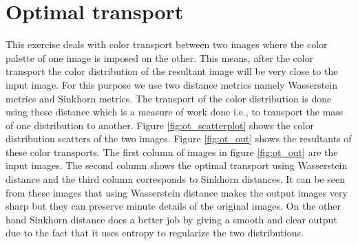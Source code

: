 \section{Optimal transport}
This exercise deals with color transport between two images where the color palette of one image is imposed on the other. This means, after the color transport the color distribution of the resultant image will be very close to the input image. For this purpose we use two distance metrics namely Wasserstein metrics and Sinkhorn  metrics. The transport of the color distribution is done using these distance which is a measure of work done i.e., to transport the mass of one distribution to another.  Figure \ref{fig:ot_scatterplot} shows the color distribution scatters of the two images. Figure \ref{fig:ot_out} shows the resultants of these color transports. The first column of images in figure \ref{fig:ot_out} are the input images. The second column shows the optimal transport using  Wasserstein distance and the third column corresponds to Sinkhorn distances. It can be seen from these images that using Wasserstein distance makes the output images very sharp but they can preserve minute details of the original images. On the other hand Sinkhorn distance does a better job by giving a smooth and clear output due to the fact that it uses entropy to regularize the two distributions.
\newpage
